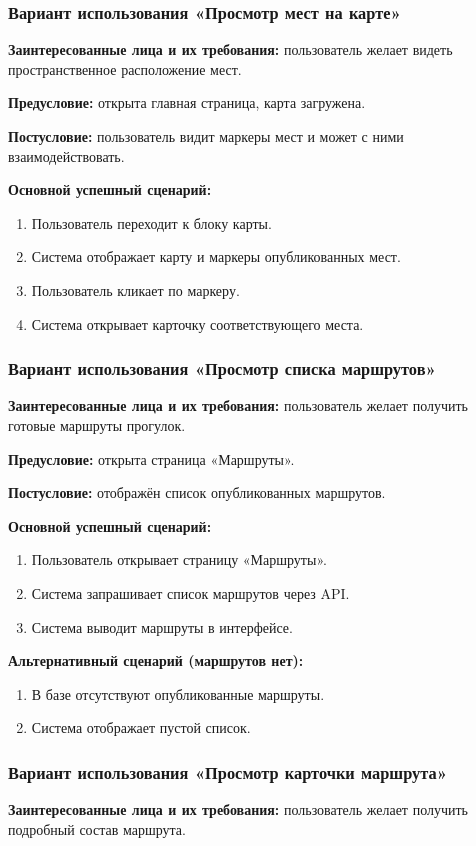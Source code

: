 \subsubsection{Вариант использования «Просмотр мест на карте»}
\textbf{Заинтересованные лица и их требования:} пользователь желает видеть пространственное расположение мест.

\textbf{Предусловие:} открыта главная страница, карта загружена.

\textbf{Постусловие:} пользователь видит маркеры мест и может с ними взаимодействовать.

\textbf{Основной успешный сценарий:}
\begin{enumerate}
	\item Пользователь переходит к блоку карты.
	\item Система отображает карту и маркеры опубликованных мест.
	\item Пользователь кликает по маркеру.
	\item Система открывает карточку соответствующего места.
\end{enumerate}

\subsubsection{Вариант использования «Просмотр списка маршрутов»}
\textbf{Заинтересованные лица и их требования:} пользователь желает получить готовые маршруты прогулок.

\textbf{Предусловие:} открыта страница «Маршруты».

\textbf{Постусловие:} отображён список опубликованных маршрутов.

\textbf{Основной успешный сценарий:}
\begin{enumerate}
	\item Пользователь открывает страницу «Маршруты».
	\item Система запрашивает список маршрутов через API.
	\item Система выводит маршруты в интерфейсе.
\end{enumerate}

\textbf{Альтернативный сценарий (маршрутов нет):} 
\begin{enumerate}
	\item В базе отсутствуют опубликованные маршруты.
	\item Система отображает пустой список.
\end{enumerate}

\subsubsection{Вариант использования «Просмотр карточки маршрута»}
\textbf{Заинтересованные лица и их требования:} пользователь желает получить подробный состав маршрута.

